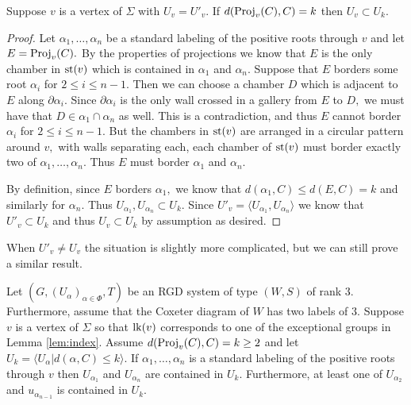\documentclass[class=book, crop=false]{standalone}
\begin{document}
\begin{lemma}
	\label{lem:deg3fg}
	Suppose $v$ is a vertex of $\Sigma$ with $U_v=U'_v.$ If $d(\mathrm{Proj}_v(C),C)=k$ then $U_v\subset U_k.$
\end{lemma}
\begin{proof}
	Let $\alpha_1,\dots,\alpha_n$ be a standard labeling of the positive roots through $v$ and let $E=\mathrm{Proj}_v(C).$ By the properties of projections we know that $E$ is the only chamber in $\mathrm{st}(v)$ which is contained in $\alpha_1$ and $\alpha_n.$ Suppose that $E$ borders some root $\alpha_i$ for $2\le i\le n-1.$ Then we can choose a chamber $D$ which is adjacent to $E$ along $\partial\alpha_i.$ Since $\partial \alpha_i$ is the only wall crossed in a gallery from $E$ to $D,$ we must have that $D\in \alpha_1\cap \alpha_n$ as well. This is a contradiction, and thus $E$ cannot border $\alpha_i$ for $2\le i\le n-1.$ But the chambers in $\mathrm{st}(v)$ are arranged in a circular pattern around $v,$ with walls separating each, each chamber of $\mathrm{st}(v)$ must border exactly two of $\alpha_1,\dots,\alpha_n.$ Thus $E$ must border $\alpha_1$ and $\alpha_n.$

	By definition, since $E$ borders $\alpha_1,$ we know that $d(\alpha_1,C)\le d(E,C)=k$ and similarly for $\alpha_n.$ Thus $U_{\alpha_1},U_{\alpha_n}\subset U_k.$ Since $U'_v=\langle U_{\alpha_1},U_{\alpha_n}\rangle$ we know that $U'_v\subset U_k$ and thus $U_v\subset U_k$ by assumption as desired.
\end{proof}
When $U'_v\neq U_v$ the situation is slightly more complicated, but we can still prove a similar result.
\begin{lemma}
	\label{lem:exdegfg}
	Let $(G,(U_\alpha)_{\alpha\in \Phi},T)$ be an RGD system of type $(W,S)$ of rank $3.$ Furthermore, assume that the Coxeter diagram of $W$ has two labels of $3.$ Suppose $v$ is a vertex of $\Sigma$ so that $\mathrm{lk}(v)$ corresponds to one of the exceptional groups in Lemma \ref{lem:index}. Assume $d(\mathrm{Proj}_v(C),C)=k\ge 2$ and let $U_k=\langle U_\alpha|d(\alpha,C)\le k\rangle.$ If $\alpha_1,\dots,\alpha_n$ is a standard labeling of the positive roots through $v$ then $U_{\alpha_1}$ and $U_{\alpha_n}$ are contained in $U_k.$ Furthermore, at least one of $U_{\alpha_2}$ and $u_{\alpha_{n-1}}$ is contained in $U_k.$
\end{lemma}
\end{document}
